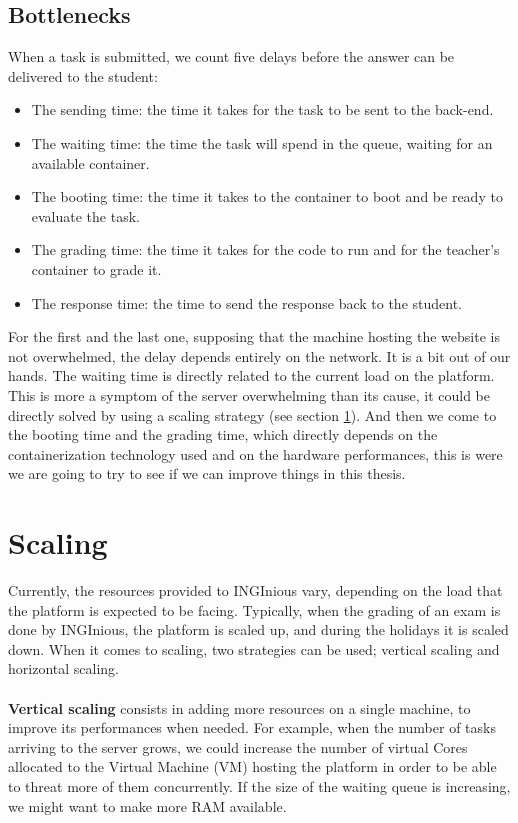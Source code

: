\subsection{Bottlenecks}
When a task is submitted, we count five delays before the answer can be delivered to the student:
\begin{itemize}
  \item The sending time: the time it takes for the task to be sent to the back-end.
  \item The waiting time: the time the task will spend in the queue, waiting for an available container.
  \item The booting time: the time it takes to the container to boot and be ready to evaluate the task.
  \item The grading time: the time it takes for the code to run and for the teacher's container to grade it.
  \item The response time: the time to send the response back to the student.
\end{itemize}
For the first and the last one, supposing that the machine hosting the website is not overwhelmed, the delay depends entirely on the network. It is a bit out of our hands.  The waiting time is directly related to the current load on the platform. This is more a symptom of the server overwhelming than its cause, it could be directly solved by using a scaling strategy (see section \ref{section:scaling}).  And then we come to the booting time and the grading time, which directly depends on the containerization technology used and on the hardware performances, this is were we are going to try to see if we can improve things in this thesis.

\section{Scaling} \label{section:scaling}
Currently, the resources provided to INGInious vary, depending on the load that the platform is expected to be facing.  Typically, when the grading of an exam is done by INGInious, the platform is scaled up, and during the holidays it is scaled down.  When it comes to scaling, two strategies can be used; vertical scaling and horizontal scaling.

\paragraph{} \textbf{Vertical scaling} consists in adding more resources on a single machine, to improve its performances when needed.  For example, when the number of tasks arriving to the server grows, we could increase the number of virtual Cores allocated to the Virtual Machine (VM) hosting the platform in order to be able to threat more of them concurrently.  If the size of the waiting queue is increasing, we might want to make more RAM available.

